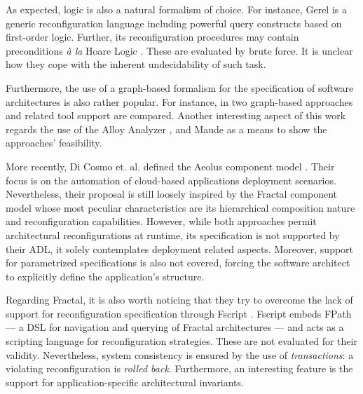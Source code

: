 	
				
		
	As expected, logic is also a natural formalism of choice. For instance, Gerel \cite{endler1992}
	is a generic reconfiguration language including powerful query constructs based on first-order logic.
	Further, its reconfiguration procedures may contain preconditions \textit{\`a la} 
	Hoare Logic \cite{Hoare69anaxiomatic}. These are evaluated by brute force. It is unclear
	how they cope with the inherent undecidability of such task. 


	Furthermore, the use of a graph-based formalism for the specification of software architectures
	is also rather popular. For instance, in \cite{Bruni:2008:GDA:1424922.1424928} two graph-based
	approaches and related tool support are compared. Another interesting aspect of this work
	regards the use of the Alloy Analyzer \cite{Jackson:2002:ALO:505145.505149}, 
	and Maude \cite{Clavel:2002:MSP:633559.633563} as a means to show the approaches' feasibility. 
		

		More recently, 	Di Cosmo et. al. defined the Aeolus component model \cite{conf/sefm/CosmoZZ12}. Their focus
	is on the automation of cloud-based applications deployment scenarios. Nevertheless, their 
    proposal is still loosely inspired by the Fractal component model \cite{fractalSpec} whose
	most peculiar characteristics are its hierarchical composition nature and reconfiguration capabilities.
	However, while both approaches permit architectural reconfigurations at runtime, 
    its specification is not supported by their \ac{ADL}, it solely contemplates deployment related
    aspects. Moreover, support for
	parametrized specifications is also not covered, forcing the software architect to explicitly 	
	define the application's structure.    
	
		Regarding Fractal,  it is also worth noticing that they try to overcome the lack of
	support for reconfiguration specification	 through 
	Fscript \cite{DAVID:2008:HAL-00468474:1}. Fscript embeds FPath --- a DSL for navigation and querying of
	Fractal architectures --- and acts as a scripting language for reconfiguration strategies. These
	are not evaluated for their validity. Nevertheless, system consistency is ensured by the use of
	\textit{transactions}: a violating reconfiguration is \textit{rolled back}.
	Furthermore, an interesting feature is the support for application-specific architectural
	invariants.


